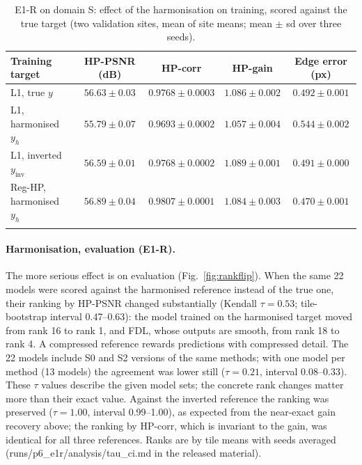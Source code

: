 \documentclass[pdflatex,sn-basic,referee,lineno]{sn-jnl}
\begin{document}
\begin{table}[t]
\caption{E1-R on domain S: effect of the harmonisation on training, scored against the true target (two validation
sites, mean of site means; mean $\pm$ sd over three seeds).}\label{tab:e1r}
\footnotesize
\begin{tabular*}{\textwidth}{@{\extracolsep\fill}lcccc}
\toprule
Training target & HP-PSNR (dB) & HP-corr & HP-gain & Edge error (px) \\
\midrule
L1, true $y$ & $56.63\pm0.03$ & $0.9768\pm0.0003$ & $1.086\pm0.002$ & $0.492\pm0.001$ \\
L1, harmonised $y_h$ & $55.79\pm0.07$ & $0.9693\pm0.0002$ & $1.057\pm0.004$ & $0.544\pm0.002$ \\
L1, inverted $y_{\mathrm{inv}}$ & $56.59\pm0.01$ & $0.9768\pm0.0002$ & $1.089\pm0.001$ & $0.491\pm0.000$ \\
Reg-HP, harmonised $y_h$ & $56.89\pm0.04$ & $0.9807\pm0.0001$ & $1.084\pm0.003$ & $0.470\pm0.001$ \\
\botrule
\end{tabular*}
\end{table}

\paragraph{Harmonisation, evaluation (E1-R).} The more serious effect is on evaluation (Fig.~\ref{fig:rankflip}).
When the same 22 models were scored against the harmonised reference instead of the true one, their ranking by
HP-PSNR changed substantially (Kendall $\tau=0.53$; tile-bootstrap interval 0.47--0.63): the model trained on the harmonised
target moved from rank 16 to rank 1, and FDL, whose outputs are smooth, from rank 18 to rank 4. A compressed
reference rewards predictions with compressed detail. The 22 models include S0 and S2 versions of the same methods;
with one model per method (13 models) the agreement was lower still ($\tau=0.21$, interval 0.08--0.33). These
$\tau$ values describe the given model sets; the concrete rank changes matter more than their exact value. Against the
inverted reference the ranking was preserved ($\tau=1.00$, interval 0.99--1.00), as expected from the near-exact gain
recovery above; the ranking by HP-corr, which is invariant to the gain, was identical for all three references.
Ranks are by tile means with seeds averaged (runs/p6\_e1r/analysis/tau\_ci.md in the released material).
\end{document}
